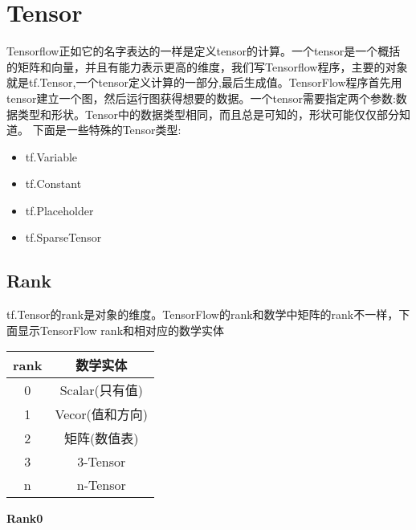 \section{Tensor}
Tensorflow正如它的名字表达的一样是定义tensor的计算。一个tensor是一个概括的矩阵和向量，并且有能力表示更高的维度，我们写Tensorflow程序，主要的对象就是tf.Tensor,一个tensor定义计算的一部分,最后生成值。TensorFlow程序首先用tensor建立一个图，然后运行图获得想要的数据。一个tensor需要指定两个参数:数据类型和形状。Tensor中的数据类型相同，而且总是可知的，形状可能仅仅部分知道。
下面是一些特殊的Tensor类型:
\begin{itemize}
\item	tf.Variable
\item	tf.Constant
\item	tf.Placeholder
\item	tf.SparseTensor
\end{itemize}
\subsection{Rank}
tf.Tensor的rank是对象的维度。TensorFlow的rank和数学中矩阵的rank不一样，下面显示TensorFlow rank和相对应的数学实体
\begin{center}
\begin{tabular}{|c|c|}
\hline
rank&数学实体\\
\hline
0&Scalar(只有值)\\
\hline
1&Vecor(值和方向)\\
\hline
2&矩阵(数值表)\\
\hline
3&3-Tensor\\
\hline
n&n-Tensor\\
\hline
\end{tabular}
\end{center}
\textbf{Rank0}

